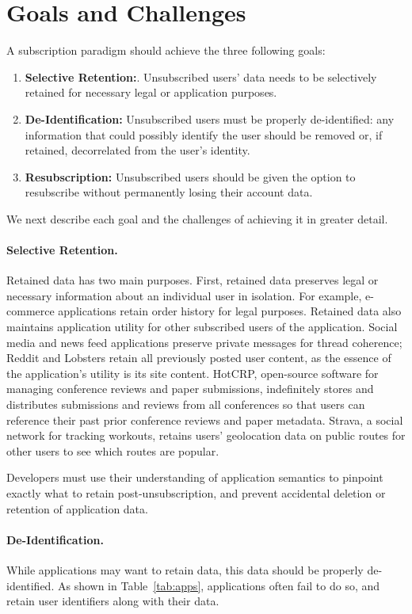 \section{Goals and Challenges}
A subscription paradigm should achieve the three following goals:
\begin{enumerate}
    \item \textbf{Selective Retention:}. Unsubscribed users' data needs to be selectively retained for necessary legal or application purposes.
    \item \textbf{De-Identification:} Unsubscribed users must be properly de-identified: any
        information that could possibly identify the user should be removed or, if retained, decorrelated from the user's identity.
\item \textbf{Resubscription:} Unsubscribed users should be given the option to resubscribe without permanently losing their account
data.
\end{enumerate}

We next describe each goal and the challenges of achieving it in greater detail.

\paragraph{Selective Retention.}
Retained data has two main purposes. First, retained data preserves legal or
necessary information about an individual user in isolation. For example, e-commerce applications
retain order history for legal purposes.
Retained data also maintains application utility for other subscribed users of the application.
Social media and news feed applications preserve private messages for thread coherence; Reddit and
Lobsters retain all previously posted user content, as the essence of the application's utility is
its site content.  HotCRP, open-source software for managing conference reviews and paper
submissions, indefinitely stores and distributes submissions and reviews from all conferences so
that users can reference their past prior conference reviews and paper metadata. Strava, a social
network for tracking workouts, retains users' geolocation data on public routes for other users to
see which routes are popular.

Developers must use their understanding of application semantics to pinpoint exactly what 
to retain post-unsubscription, and prevent accidental deletion or retention of application
data.

\paragraph{De-Identification.}
While applications may want to retain data, this data should be properly de-identified. As shown in
Table~\ref{tab:apps}, applications often fail to do so, and retain user identifiers along with their
data. 

